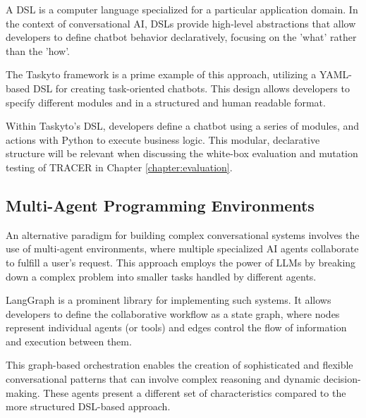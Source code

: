 A \acl{DSL} is a computer language
specialized for a particular application domain.
In the context of conversational AI,
\acp{DSL} provide high-level abstractions
that allow developers to define chatbot behavior declaratively,
focusing on the 'what' rather than the 'how'.

The Taskyto framework \autocite{sanchezcuadradoAutomatingDevelopmentTaskoriented2024} is a prime example of this approach,
utilizing a YAML-based \ac{DSL} for creating task-oriented chatbots.
This design allows developers to specify
different modules and in a structured and human readable format.

Within Taskyto's \ac{DSL}, developers define a chatbot using a series of modules,
and actions with Python to execute business logic.
This modular, declarative structure
will be relevant when discussing the white-box evaluation and mutation testing of \ac{TRACER} in Chapter \ref{chapter:evaluation}.

\subsection{Multi-Agent Programming Environments}

An alternative paradigm for building complex conversational systems
involves the use of multi-agent environments,
where multiple specialized \ac{AI} agents collaborate to fulfill a user's request.
This approach employs the power of \acp{LLM}
by breaking down a complex problem into smaller tasks handled by different agents.

LangGraph \autocite{LangGraph} is a prominent library for implementing such systems.
It allows developers to define the collaborative workflow as a state graph,
where nodes represent individual agents (or tools)
and edges control the flow of information and execution between them.

This graph-based orchestration enables the creation of
sophisticated and flexible conversational patterns
that can involve complex reasoning and dynamic decision-making.
These agents present a different set of characteristics
compared to the more structured \ac{DSL}-based approach.

\indent

